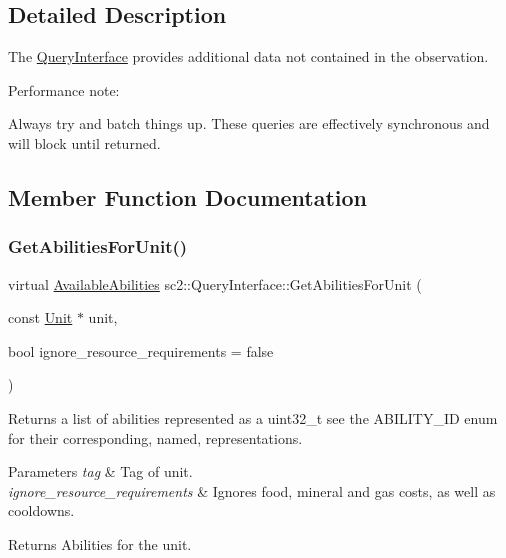 \subsection{Detailed Description}
The \hyperlink{classsc2_1_1_query_interface}{Query\+Interface} provides additional data not contained in the observation.

Performance note\+:
\begin{DoxyItemize}
\item Always try and batch things up. These queries are effectively synchronous and will block until returned. 
\end{DoxyItemize}

\subsection{Member Function Documentation}
\mbox{\label{classsc2_1_1_query_interface_a76a602ebb27600b636712bd0bf062201}} 
\subsubsection{\texorpdfstring{Get\+Abilities\+For\+Unit()}{GetAbilitiesForUnit()}}
{\footnotesize\ttfamily virtual \hyperlink{structsc2_1_1_available_abilities}{Available\+Abilities} sc2\+::\+Query\+Interface\+::\+Get\+Abilities\+For\+Unit (\begin{DoxyParamCaption}\item[{const \hyperlink{classsc2_1_1_unit}{Unit} $\ast$}]{unit,  }\item[{bool}]{ignore\+\_\+resource\+\_\+requirements = {\ttfamily false} }\end{DoxyParamCaption})\hspace{0.3cm}{\ttfamily [pure virtual]}}

Returns a list of abilities represented as a uint32\+\_\+t see the A\+B\+I\+L\+I\+T\+Y\+\_\+\+ID enum for their corresponding, named, representations. 
\begin{DoxyParams}{Parameters}
{\em tag} & Tag of unit. \\
\hline
{\em ignore\+\_\+resource\+\_\+requirements} & Ignores food, mineral and gas costs, as well as cooldowns. \\
\hline
\end{DoxyParams}
\begin{DoxyReturn}{Returns}
Abilities for the unit. 
\end{DoxyReturn}
\mbox{\label{classsc2_1_1_query_interface_a8b50ebad97a2f1139045a61b85a3300d}} 
